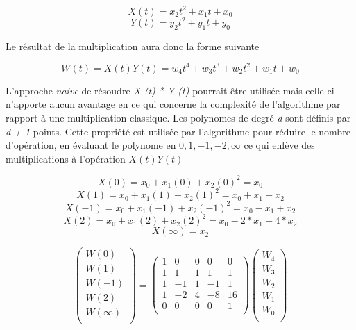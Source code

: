 \documentclass[letterpaper]{article}
\begin{document}
    $$X(t) = x_2 t^2 + x_1 t + x_0$$
    $$Y(t) = y_2 t^2 + y_1 t + y_0$$

Le résultat de la multiplication aura donc la forme suivante

    $$W(t) = X(t) Y(t) =  w_4 t^4 + w_3 t^3 + w_2 t^2 + w_1 t + w_0$$

L'approche \emph{naive} de résoudre \emph{X (t) * Y (t)} pourrait être utilisée
mais celle-ci n'apporte aucun avantage en ce qui concerne la complexité de
l'algorithme par rapport à une multiplication classique.\cite{gmplib2014}
\newline
Les polynomes de degré \emph{d} sont définis par \emph{d + 1} points. Cette
propriété est utilisée par l'algorithme pour réduire le nombre d'opération, en
évaluant le polynome en $0, 1, -1, -2, \infty$ ce qui enlève des multiplications
à l'opération $X(t) Y(t)$\cite{wikitoom3}

    $$X (0) = x_{0} + x_{1} (0) + x_2 {(0)}^{2} = x_{0}$$
    $$X(1) = x_0 + x_1(1) + x_2{(1)}^2 = x_0 + x_1 + x_2$$
    $$X(-1) = x_0 + x_1(-1) + x_2{(-1)}^2 = x_0 - x_1 + x_2$$
    $$X(2) = x_0 + x_1(2) + x_2{(2)}^2 = x_0 - 2 * x_1 + 4 * x_2$$
    $$X(\infty) = x_2$$

$$
\begin{pmatrix}
  W (0) \\
  W (1) \\
  W (-1) \\
  W (2) \\
  W (\infty) \\
\end{pmatrix}
 =
\begin{pmatrix}
  1 & 0 & 0 & 0 & 0 \\
  1 & 1 & 1 & 1 & 1 \\
  1 &-1 & 1 &-1 & 1 \\
  1 &-2 & 4 &-8 &16 \\
  0 & 0 & 0 & 0 & 1 \\
\end{pmatrix}
\begin{pmatrix}
  W_4 \\
  W_3 \\
  W_2 \\
  W_1 \\
  W_0 \\
\end{pmatrix}
$$
\end{document}
